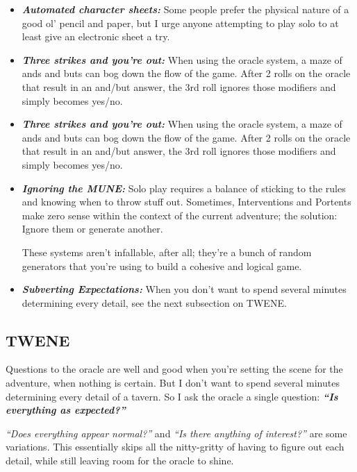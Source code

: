 \documentclass[12pt, letterpaper]{article}
\begin{document}
\begin{itemize}
\item \textit{\textbf{Automated character sheets:}} Some people prefer the physical nature of a good ol' pencil and paper, but I urge anyone attempting to play solo to at least give an electronic sheet a try.

\item \textit{\textbf{Three strikes and you're out:}} When using the oracle system, a maze of ands and buts can bog down the flow of the game. After 2 rolls on the oracle that result in an and/but answer, the 3rd roll ignores those modifiers and simply becomes yes/no.

\item \textit{\textbf{Three strikes and you're out:}} When using the oracle system, a maze of ands and buts can bog down the flow of the game. After 2 rolls on the oracle that result in an and/but answer, the 3rd roll ignores those modifiers and simply becomes yes/no.

\item \textit{\textbf{Ignoring the MUNE:}} Solo play requires a balance of sticking to the rules and knowing when to throw stuff out. Sometimes, Interventions and Portents make zero sense within the context of the current adventure; the solution: Ignore them or generate another.

These systems aren't infallable, after all; they're a bunch of random generators that you're using to build a cohesive and logical game.

\item \textit{\textbf{Subverting Expectations:}} When you don't want to spend several minutes determining every detail, see the next subsection on TWENE.
\end{itemize}

\subsection*{\textbf{TWENE}}

Questions to the oracle are well and good when you're setting the scene for the adventure, when nothing is certain. But I don't want to spend several minutes determining every detail of a tavern. So I ask the oracle a single question: \textit{\textbf{“Is everything as expected?”}}

 \textit{``Does everything appear normal?''} and \textit{``Is there anything of interest?''} are some variations. This essentially skips all the nitty-gritty of having to figure out each detail, while still leaving room for the oracle to shine.
\end{document}
